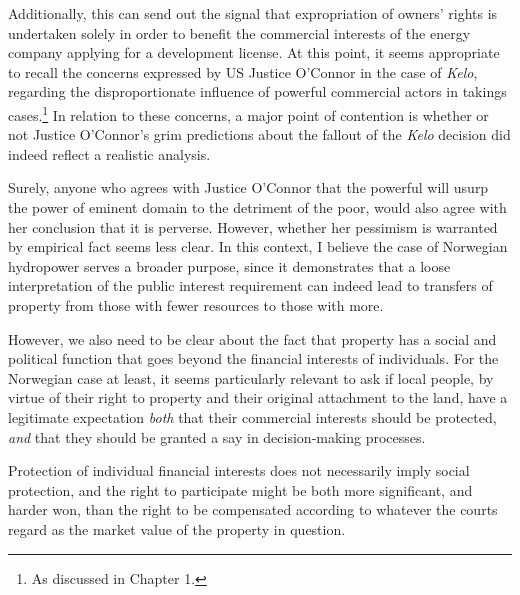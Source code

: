 Additionally, this can send out the signal that expropriation of owners' rights is undertaken solely in order to benefit the commercial interests of the energy company applying for a development license. At this point, it seems appropriate to recall the concerns expressed by US Justice O'Connor in the case of {\it Kelo}, regarding the disproportionate influence of powerful commercial actors in takings cases.\footnote{As discussed in Chapter 1.} In relation to these concerns, a major point of contention is  whether or not Justice O'Connor's grim predictions about the fallout of the {\it Kelo} decision did indeed reflect a realistic analysis. 

Surely, anyone who agrees with Justice O'Connor that the powerful will usurp the power of eminent domain to the detriment of the poor, would also agree with her conclusion that it is perverse. However, whether her pessimism is warranted by empirical fact seems less clear. In this context, I believe the case of Norwegian hydropower serves a broader purpose, since it demonstrates that a loose interpretation of the public interest requirement can  indeed lead to transfers of property from those with fewer resources to those with more.

However, we also need to be clear about the fact that property has a social and political function that goes beyond the financial interests of individuals. For the Norwegian case at least, it seems particularly relevant to ask if local people, by virtue of their right to property and their original attachment to the land, have a legitimate expectation \emph{both} that their commercial interests should be protected, \emph{and} that they should be granted a say in decision-making processes. 

Protection of individual financial interests does not necessarily imply social protection, and the right to participate might be both more significant, and harder won, than the right to be compensated according to whatever the courts regard as the market value of the property in question.

